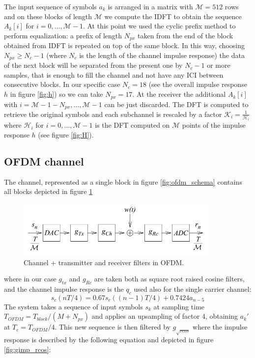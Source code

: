 \documentclass[a4paper,11.5pt]{article}
\begin{document}
The input sequence of symbols $a_k$ is arranged in a matrix with $\mathcal{M}=512$ rows and on these blocks of length $\mathcal{M}$ we compute the IDFT to obtain the sequence $A_k[i]$ for $i=0,\dots , \mathcal{M}-1$. At this point we used the cyclic prefix method to perform equalization: a prefix of length $N_{px}$ taken from the end of the block obtained from IDFT is repeated on top of the same block. In this way, choosing $N_{px}\geq N_c-1$ (where $N_c$ is the length of the channel impulse response) the data of the next block will be separated from the present one by $N_c-1$ or more samples, that is enough to fill the channel and not have any ICI between consecutive blocks. In our specific case $N_c=18$ (see the overall impulse response $h$ in figure \ref{fig:h}) so we can take $N_{px}=17$.
 At the receiver the additional $A_k[i]$ with $i=\mathcal{M}-1-N_{px},\dots ,\mathcal{M}-1$ can be just discarded. The DFT is computed to retrieve the original symbols and each subchannel is rescaled by a factor $\mathcal{K}_i = \frac{1}{\mathcal{H}_i}$ where $\mathcal{H}_i$ for $i=0, \dots, \mathcal{M}-1$ is the DFT  computed on $\mathcal{M}$ points of the impulse response $h$ (see figure \ref{fig:H}).

\subsection*{OFDM channel}

The channel, represented as a single block in figure \ref{fig:ofdm_schema} contains all blocks depicted in figure \ref{fig:ofdm_channel_schema}

\begin{figure}[H]
	\begin{center}   
		\includegraphics[width=10cm]{figs/OFDM_channel_schema.png} 
		\caption{Channel + transmitter and receiver filters in OFDM.}
		\label{fig:ofdm_channel_schema}
	\end{center}
\end{figure}

where in our case $g_{tx}$ and $g_{Rc}$ are taken both as square root raised cosine filters, and the channel impulse response is the $q_c$ used also for the single carrier channel: 
\begin{equation}\label{eq:q_c}
s_c(nT/4) = 0.67 s_c((n-1)T/4) + 0.7424 a_{n-5}
\end{equation}
The system takes a sequence of input symbols $s_k$ at sampling time $T_{OFDM}=T_{block}/(M + N_{px})$ and applies an upsampling of factor 4, obtaining $a_k'$ at $T_c = T_{OFDM}/4$. This new sequence is then filtered by $g_{\sqrt{rcos}}$ where the impulse response is described by the following equation and depicted in figure \ref{fig:gimp_rcos}:
\end{document}
